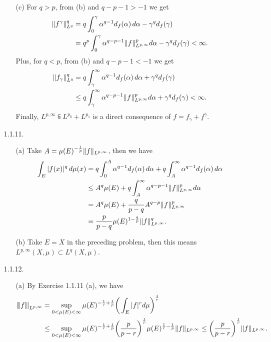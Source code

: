 \begin{enumerate}
\begin{enumerate}
    \item[(c)] For $q>p$, from (b) and $q-p-1>-1$ we get
    \begin{align*}
        \norm{f^{\gamma}}_{L^q}^q&=q\int_0^\gamma\alpha^{q-1}d_{f}(\alpha)\,d\alpha - \gamma^{q}d_{f}(\gamma)\\
        &=q^p\int_0^\gamma\alpha^{q-p-1}\|f\|_{L^{p,\infty}}^pd\alpha - \gamma^{q}d_{f}(\gamma)<\infty.
    \end{align*}
    Plus, for $q<p$, from (b) and $q-p-1<-1$ we get
    \begin{align*}
    \norm{f_{\gamma}}_{L^q}^{q} &= q\int_{\gamma}^\infty\alpha^{q-1}d_{f}(\alpha)\,d\alpha + \gamma^{q}d_{f}(\gamma)\\
    &\leq q\int_{\gamma}^\infty\alpha^{q-p-1}\norm{f}_{L^{p,\infty}}^pd\alpha + \gamma^{q}d_{f}(\gamma) < \infty.
    \end{align*}
    Finally, $L^{p,\infty} \subseteqq L^{p_0}+L^{p_1}$ is a direct consequence of 
    $f=f_{\gamma}+f^{\gamma}$.
    \end{enumerate}

\item[1.1.11.]
    \begin{enumerate}
    \item[(a)] Take $A=\mu(E)^{-\frac{1}{p}}\Vert f \Vert_{L^{p,\infty}}$, then we have
    \begin{equation*}\begin{aligned}
    \int_{E}|f(x)|^{q}\,d\mu(x) &= q\int_{0}^{A}\alpha^{q-1}d_{f}(\alpha)\,d\alpha 
    + q\int_{A}^{\infty}\alpha^{q-1}d_{f}(\alpha)\,d\alpha \\
    &\leq A^{q}\mu(E) + q\int_A^\infty \alpha^{q-p-1}\Vert f \Vert_{L^{p,\infty}}^pd\alpha \\
    & =A^{q}\mu(E) + \frac{q}{p-q}A^{q-p}\Vert f \Vert_{L^{p,\infty}}^p \\
    &= \frac{p}{p-q}\mu(E)^{1-\frac{q}{p}}\Vert f \Vert_{L^{p,\infty}}^{q}.
    \end{aligned}\end{equation*}

    \item[(b)] Take $E=X$ in the preceding problem, 
    then this means $L^{p,\infty}(X,\mu) \subset L^{q}(X,\mu)$.
    \end{enumerate}

\item[1.1.12.]
    \begin{enumerate}
    \item[(a)] By Exercise 1.1.11 (a), we have 
    \begin{equation*}\begin{aligned}
    {\left\vert\kern-0.25ex\left\vert\kern-0.25ex\left\vert f \right\vert\kern-0.25ex\right\vert\kern-0.25ex\right\vert}_{L^{p,\infty}} &= \sup_{0<\mu(E)<\infty}
    \mu(E)^{-\frac{1}{r}+\frac{1}{p}}\bigg(\int_{E}|f|^{r}d\mu\bigg)^{\frac{1}{r}} \\
    &\leq \sup_{0<\mu(E)<\infty}\mu(E)^{-\frac{1}{r}+\frac{1}{p}}
    \bigg(\frac{p}{p-r}\bigg)^{\frac{1}{r}}\mu(E)^{\frac{1}{r}-\frac{1}{p}}\Vert f \Vert_{L^{p,\infty}} 
    \leq \bigg(\frac{p}{p-r}\bigg)^{\frac{1}{r}}\Vert f \Vert_{L^{p,\infty}}.
    \end{aligned}\end{equation*}


\end{enumerate}
\end{enumerate}
